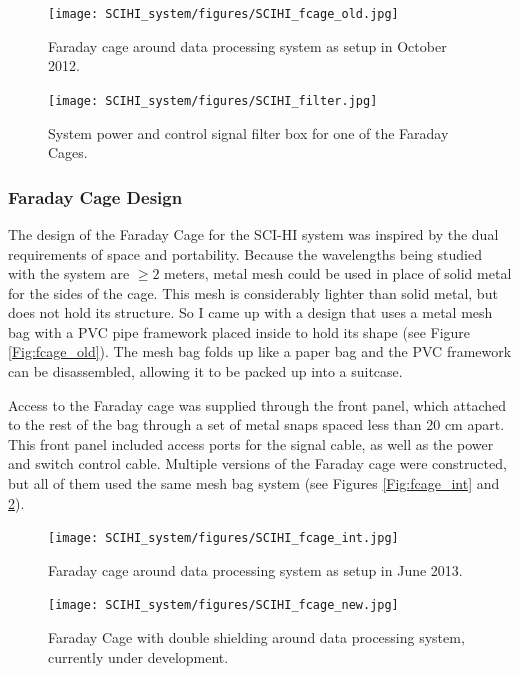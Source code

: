 \begin{figure}[htb]
\centering
\begin{minipage}[b]{0.36\textwidth}
\centering
\texttt{[image: SCIHI\_system/figures/SCIHI\_fcage\_old.jpg]}
\caption{Faraday cage around data processing system as setup in October 2012.}
\label{Fig:fcage_old}
\end{minipage}%
\begin{minipage}[b]{0.02\textwidth}
\hspace{1cm}
\end{minipage}%
\begin{minipage}[b]{0.58\textwidth}
\centering
\texttt{[image: SCIHI\_system/figures/SCIHI\_filter.jpg]}
\caption{System power and control signal filter box for one of the Faraday Cages.}
\label{Fig:fcage_filter}
\end{minipage}
\end{figure}

\subsubsection{Faraday Cage Design}
The design of the Faraday Cage for the SCI-HI system was inspired by the dual requirements of space and portability. Because the wavelengths being studied with the system are $\geq 2$ meters, metal mesh could be used in place of solid metal for the sides of the cage. This mesh is considerably lighter than solid metal, but does not hold its structure. So I came up with a design that uses a metal mesh bag with a PVC pipe framework placed inside to hold its shape (see Figure \ref{Fig:fcage_old}). The mesh bag folds up like a paper bag and the PVC framework can be disassembled, allowing it to be packed up into a suitcase. 

Access to the Faraday cage was supplied through the front panel, which attached to the rest of the bag through a set of metal snaps spaced less than 20 cm apart. This front panel included access ports for the signal cable, as well as the power and switch control cable. Multiple versions of the Faraday cage were constructed, but all of them used the same mesh bag system (see Figures \ref{Fig:fcage_int} and \ref{Fig:fcage_new}). 

\begin{figure}[htb]
\centering
\begin{minipage}[b]{0.44\textwidth}
\centering
\texttt{[image: SCIHI\_system/figures/SCIHI\_fcage\_int.jpg]}
\caption{Faraday cage around data processing system as setup in June 2013.}
\label{Fig:fcage_int}
\end{minipage}%
\begin{minipage}[b]{0.02\textwidth}
\hspace{1cm}
\end{minipage}%
\begin{minipage}[b]{0.50\textwidth}
\centering
\texttt{[image: SCIHI\_system/figures/SCIHI\_fcage\_new.jpg]}
\caption{Faraday Cage with double shielding around data processing system, currently under development.}
\label{Fig:fcage_new}
\end{minipage}
\end{figure}


